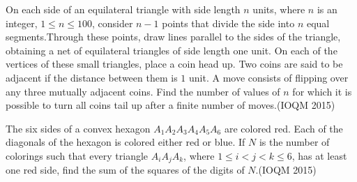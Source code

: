 	\item On each side of an equilateral triangle with side length $n$ units, where $n$ is an integer, $1 \leq n \leq 100$, consider $n - 1$ points that divide the side into $n$ equal segments.Through these points, draw lines parallel to the sides of the triangle, obtaining a net of equilateral triangles of side length one unit. On each of the vertices of these small triangles, place a coin head up. Two coins are said to be adjacent if the distance between them is $1$ unit. A move consists of flipping over any three mutually adjacent coins. Find the number of values of $n$ for which it is possible to turn all coins tail up after a finite number of moves.\hfill(IOQM 2015)
	    \item The six sides of a convex hexagon $A_{1}A_{2}A_{3}A_{4}A_{5}A_{6}$ are colored red. Each of the diagonals of the hexagon is colored either red or blue. If $N$ is the number of colorings such that every triangle $A_{i}A_{j}A_{k}$, where $1 \leq i < j < k \leq 6$, has at least one red side, find the sum of the squares of the digits of $N$.\hfill(IOQM 2015)
		    \fi
